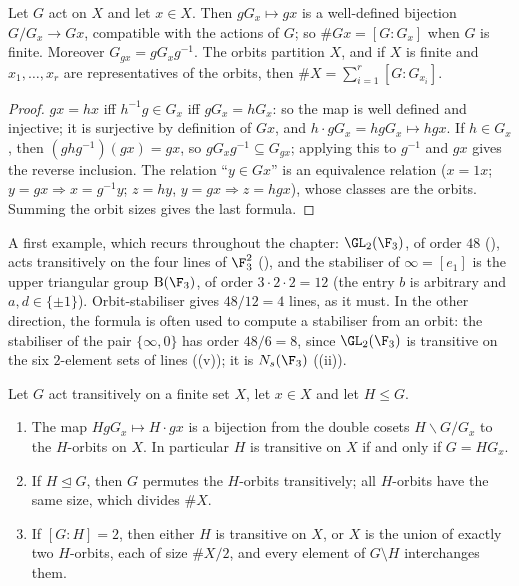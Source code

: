 \begin{theorem}\label{thm:groups:orbitstab}
Let $G$ act on $X$ and let $x\in X$. Then $gG_x\mapsto gx$ is a well-defined bijection $G/G_x\to Gx$, compatible with the actions of $G$; so
$\#Gx=[G:G_x]$ when $G$ is finite. Moreover $G_{gx}=gG_xg^{-1}$. The orbits partition $X$, and if $X$ is finite and $x_1,\dots,x_r$ are representatives
of the orbits, then $\#X=\sum_{i=1}^r[G:G_{x_i}]$.
\end{theorem}

\begin{proof}
$gx=hx$ iff $h^{-1}g\in G_x$ iff $gG_x=hG_x$: so the map is well defined and injective; it is surjective by definition of $Gx$, and
$h\cdot gG_x=hgG_x\mapsto hgx$. If $h\in G_x$, then $(ghg^{-1})(gx)=gx$, so $gG_xg^{-1}\subseteq G_{gx}$; applying this to $g^{-1}$ and $gx$ gives the
reverse inclusion. The relation ``$y\in Gx$'' is an equivalence relation ($x=1x$; $y=gx\Rightarrow x=g^{-1}y$; $z=hy$, $y=gx\Rightarrow z=hgx$), whose
classes are the orbits. Summing the orbit sizes gives the last formula.
\end{proof}

A first example, which recurs throughout the chapter: $\GL_2(\F_3)$, of order $48$ (), acts transitively on the four lines of
$\F_3^2$ (), and the stabiliser of $\infty=[e_1]$ is the upper triangular group $\mathrm B(\F_3)$, of order $3\cdot2\cdot2=12$ (the entry $b$
is arbitrary and $a,d\in\{\pm1\}$). Orbit-stabiliser gives $48/12=4$ lines, as it must. In the other direction, the formula is often used to compute a
stabiliser from an orbit: the stabiliser of the pair $\{\infty,0\}$ has order $48/6=8$, since $\GL_2(\F_3)$ is transitive on the six $2$-element sets of lines
((v)); it is $N_s(\F_3)$ ((ii)).

\begin{proposition}\label{prop:groups:suborbits}
Let $G$ act transitively on a finite set $X$, let $x\in X$ and let $H\le G$.
\begin{enumerate}[label=(\roman*)]
\item The map $HgG_x\mapsto H\cdot gx$ is a bijection from the double cosets $H\backslash G/G_x$ to the $H$-orbits on $X$. In particular $H$ is transitive
on $X$ if and only if $G=HG_x$.
\item If $H\trianglelefteq G$, then $G$ permutes the $H$-orbits transitively; all $H$-orbits have the same size, which divides $\#X$.
\item If $[G:H]=2$, then either $H$ is transitive on $X$, or $X$ is the union of exactly two $H$-orbits, each of size $\#X/2$, and every element of
$G\setminus H$ interchanges them.
\end{enumerate}
\end{proposition}

